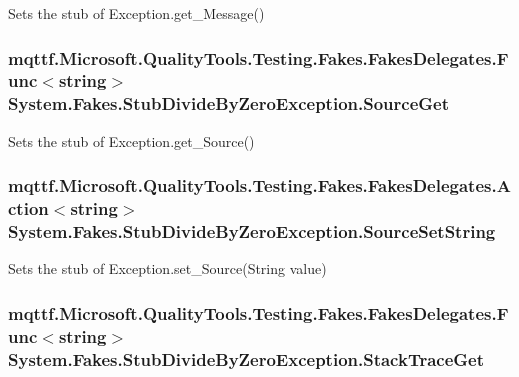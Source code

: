 Sets the stub of Exception.\-get\-\_\-\-Message()

\hypertarget{class_system_1_1_fakes_1_1_stub_divide_by_zero_exception_a2112f09c30ffbf08f95c0b6e631e4fb2}{
\subsubsection[{Source\-Get}]{\setlength{\rightskip}{0pt plus 5cm}mqttf.\-Microsoft.\-Quality\-Tools.\-Testing.\-Fakes.\-Fakes\-Delegates.\-Func$<$string$>$ System.\-Fakes.\-Stub\-Divide\-By\-Zero\-Exception.\-Source\-Get}}\label{class_system_1_1_fakes_1_1_stub_divide_by_zero_exception_a2112f09c30ffbf08f95c0b6e631e4fb2}


Sets the stub of Exception.\-get\-\_\-\-Source()

\hypertarget{class_system_1_1_fakes_1_1_stub_divide_by_zero_exception_ad6782b1bc139c7d9da8eee904dcb291a}{
\subsubsection[{Source\-Set\-String}]{\setlength{\rightskip}{0pt plus 5cm}mqttf.\-Microsoft.\-Quality\-Tools.\-Testing.\-Fakes.\-Fakes\-Delegates.\-Action$<$string$>$ System.\-Fakes.\-Stub\-Divide\-By\-Zero\-Exception.\-Source\-Set\-String}}\label{class_system_1_1_fakes_1_1_stub_divide_by_zero_exception_ad6782b1bc139c7d9da8eee904dcb291a}


Sets the stub of Exception.\-set\-\_\-\-Source(\-String value)

\hypertarget{class_system_1_1_fakes_1_1_stub_divide_by_zero_exception_a5e8a4dd839f6ac1556ad95e960477ea4}{
\subsubsection[{Stack\-Trace\-Get}]{\setlength{\rightskip}{0pt plus 5cm}mqttf.\-Microsoft.\-Quality\-Tools.\-Testing.\-Fakes.\-Fakes\-Delegates.\-Func$<$string$>$ System.\-Fakes.\-Stub\-Divide\-By\-Zero\-Exception.\-Stack\-Trace\-Get}}\label{class_system_1_1_fakes_1_1_stub_divide_by_zero_exception_a5e8a4dd839f6ac1556ad95e960477ea4}


